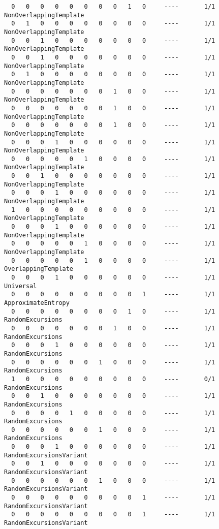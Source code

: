 \begin{code}
\begin{verbatim}
  0   0   0   0   0   0   0   0   1   0     ----       1/1       NonOverlappingTemplate
  0   1   0   0   0   0   0   0   0   0     ----       1/1       NonOverlappingTemplate
  0   0   1   0   0   0   0   0   0   0     ----       1/1       NonOverlappingTemplate
  0   0   1   0   0   0   0   0   0   0     ----       1/1       NonOverlappingTemplate
  0   1   0   0   0   0   0   0   0   0     ----       1/1       NonOverlappingTemplate
  0   0   0   0   0   0   0   1   0   0     ----       1/1       NonOverlappingTemplate
  0   0   0   0   0   0   0   1   0   0     ----       1/1       NonOverlappingTemplate
  0   0   0   0   0   0   0   1   0   0     ----       1/1       NonOverlappingTemplate
  0   0   0   1   0   0   0   0   0   0     ----       1/1       NonOverlappingTemplate
  0   0   0   0   0   1   0   0   0   0     ----       1/1       NonOverlappingTemplate
  0   0   1   0   0   0   0   0   0   0     ----       1/1       NonOverlappingTemplate
  0   0   0   1   0   0   0   0   0   0     ----       1/1       NonOverlappingTemplate
  1   0   0   0   0   0   0   0   0   0     ----       1/1       NonOverlappingTemplate
  0   0   0   1   0   0   0   0   0   0     ----       1/1       NonOverlappingTemplate
  0   0   0   0   0   1   0   0   0   0     ----       1/1       NonOverlappingTemplate
  0   0   0   0   0   1   0   0   0   0     ----       1/1       OverlappingTemplate
  0   0   0   1   0   0   0   0   0   0     ----       1/1       Universal
  0   0   0   0   0   0   0   0   0   1     ----       1/1       ApproximateEntropy
  0   0   0   0   0   0   0   0   1   0     ----       1/1       RandomExcursions
  0   0   0   0   0   0   0   1   0   0     ----       1/1       RandomExcursions
  0   0   0   1   0   0   0   0   0   0     ----       1/1       RandomExcursions
  0   0   0   0   0   0   1   0   0   0     ----       1/1       RandomExcursions
  1   0   0   0   0   0   0   0   0   0     ----       0/1       RandomExcursions
  0   0   1   0   0   0   0   0   0   0     ----       1/1       RandomExcursions
  0   0   0   0   1   0   0   0   0   0     ----       1/1       RandomExcursions
  0   0   0   0   0   0   1   0   0   0     ----       1/1       RandomExcursions
  0   0   0   1   0   0   0   0   0   0     ----       1/1       RandomExcursionsVariant
  0   0   1   0   0   0   0   0   0   0     ----       1/1       RandomExcursionsVariant
  0   0   0   0   0   0   1   0   0   0     ----       1/1       RandomExcursionsVariant
  0   0   0   0   0   0   0   0   0   1     ----       1/1       RandomExcursionsVariant
  0   0   0   0   0   0   0   0   0   1     ----       1/1       RandomExcursionsVariant

\end{verbatim}
\end{code}
